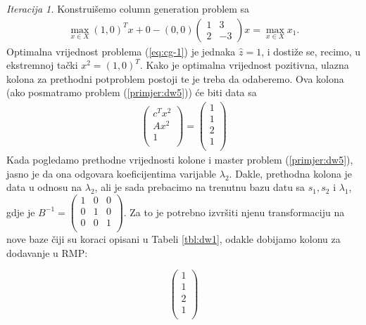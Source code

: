 \documentclass[a4paper, utf8, 11pt, colorlinks]{book}
\begin{document}
\emph{Iteracija 1.} 
Konstruišemo column generation problem sa
\begin{align}\label{eq:cg-1}
	 \max_{x \in X} (1, 0)^T x + 0 - (0, 0) \left(\begin{array}{cc}
	 	1 & 3 \\
	 	2 & -3
	 \end{array}\right)  x = \max_{x \in X} x_1. 
\end{align} 
Optimalna vrijednost problema (\ref{eq:cg-1}) je jednaka $\hat{z}=1$, i dostiže se, recimo, u ekstremnoj tački $x^2= (1, 0)^T.$ Kako je optimalna vrijednost pozitivna, ulazna kolona za prethodni potproblem postoji te je treba da odaberemo. Ova kolona (ako posmatramo problem (\ref{primjer:dw5})) će biti data sa 
\begin{align}
     \begin{pmatrix}
     	    c^T x^2 \\
     	    A x^2  \\
     	    1     \\
     \end{pmatrix} = \begin{pmatrix}
               1 \\
               1  \\
               2  \\
               1\\
 \end{pmatrix}
\end{align}
Kada pogledamo prethodne vrijednosti kolone i master problem (\ref{primjer:dw5}), jasno je da ona odgovara koeficijentima varijable $\lambda_2$. Dakle, prethodna kolona je data u odnosu na $\lambda_2$, ali je sada prebacimo na trenutnu bazu datu sa $s_1, s_2$ i $\lambda_1$, gdje je $B^{-1} =  \begin{pmatrix}
	1 & 0 & 0 \\
	0 & 1 & 0  \\
	0 & 0 & 1  \\
\end{pmatrix}. $ %
Za to je potrebno izvršiti njenu transformaciju na nove baze čiji su koraci opisani u Tabeli \ref{tbl:dw1}, odakle dobijamo kolonu za dodavanje u RMP:
 
$$	\begin{pmatrix}
	       1 \\
	      1  \\
	      2  \\
	      1\\
	\end{pmatrix}
 $$
\end{document}
